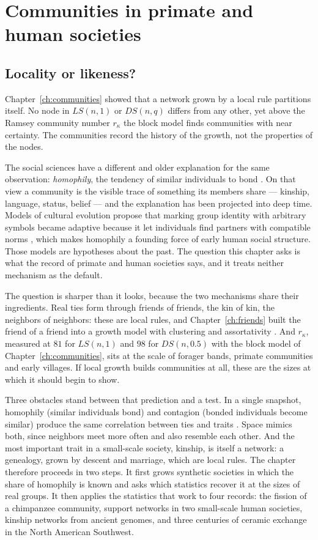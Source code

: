 \chapter{Communities in primate and human societies}
\label{ch:societies}

\section{Locality or likeness?}

Chapter~\ref{ch:communities} showed that a network grown by a local rule partitions
itself. No node in $LS(n,1)$ or $DS(n,q)$ differs from any other, yet above the Ramsey
community number $r_\kappa$ the block model finds communities with near certainty. The
communities record the history of the growth, not the properties of the nodes.

The social sciences have a different and older explanation for the same observation:
\emph{homophily}, the tendency of similar individuals to bond \citep{mcpherson2001}.
On that view a community is the visible trace of something its members share ---
kinship, language, status, belief --- and the explanation has been projected into deep
time. Models of cultural evolution propose that marking group identity with arbitrary
symbols became adaptive because it let individuals find partners with compatible norms
\citep{mcelreath2003}, which makes homophily a founding force of early human social
structure. Those models are hypotheses about the past. The question this chapter asks is
what the record of primate and human societies says, and it treats neither mechanism as
the default.

The question is sharper than it looks, because the two mechanisms share their
ingredients. Real ties form through friends of friends, the kin of kin, the neighbors of
neighbors: these are local rules, and Chapter~\ref{ch:friends} built the friend of a
friend into a growth model with clustering and assortativity
\citep{jin2001,vazquez2003,toivonen2006}. And $r_\kappa$, measured at $81$ for
$LS(n,1)$ and $98$ for $DS(n,0.5)$ with the block model of
Chapter~\ref{ch:communities}, sits at the scale of forager
bands, primate communities and early villages. If local growth builds communities at
all, these are the sizes at which it should begin to show.

Three obstacles stand between that prediction and a test. In a single snapshot,
homophily (similar individuals bond) and contagion (bonded individuals become similar)
produce the same correlation between ties and traits \citep{shalizi2011}. Space mimics
both, since neighbors meet more often and also resemble each other. And the most
important trait in a small-scale society, kinship, is itself a network: a genealogy,
grown by descent and marriage, which are local rules. The chapter therefore proceeds in
two steps. It first grows synthetic societies in which the share of homophily is known
and asks which statistics recover it at the sizes of real groups. It then applies the
statistics that work to four records: the fission of a chimpanzee community, support
networks in two small-scale human societies, kinship networks from ancient genomes, and
three centuries of ceramic exchange in the North American Southwest.

